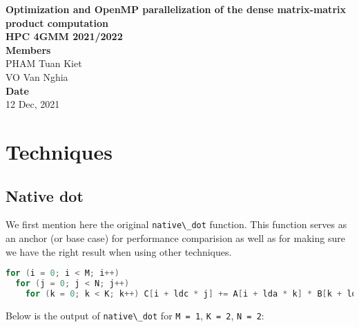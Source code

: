 \documentclass[
  12pt,
  xcolor = usenames,dvipsnames]{article}
\author{}
\date{\vspace{-2.5em}}
\newcommand{\passthrough}[1]{#1}
\begin{document}
\onehalfspacing


\vspace*{\fill}
\begin{center}
  \LARGE{\textbf{Optimization and OpenMP parallelization of the dense matrix-matrix product computation}}\\
  \Large{\textbf{HPC 4GMM 2021/2022}}\\
  \vspace*{1\baselineskip}
  \Large{\textbf{Members}}\\
  PHAM Tuan Kiet\\
  VO Van Nghia\\
  \vfill %
  \vspace*{\fill}
  \Large{\textbf{Date}}\\
  12 Dec, 2021
\end{center}

\newpage

\newpage
{}
\tableofcontents
{}

\listoffigures

\newpage
{}

\hypertarget{techniques}{%
\section{Techniques}\label{techniques}}

\hypertarget{native-dot}{%
\subsection{Native dot}\label{native-dot}}

We first mention here the original \passthrough{\lstinline!native\_dot!} function. This function serves as an anchor (or base case) for performance comparision as well as for making sure we have the right result when using other techniques.

\begin{lstlisting}[language=C]
for (i = 0; i < M; i++)
  for (j = 0; j < N; j++)
    for (k = 0; k < K; k++) C[i + ldc * j] += A[i + lda * k] * B[k + ldb * j];
\end{lstlisting}

Below is the output of \passthrough{\lstinline!native\_dot!} for \passthrough{\lstinline!M = 1!}, \passthrough{\lstinline!K = 2!}, \passthrough{\lstinline!N = 2!}:
\end{document}
